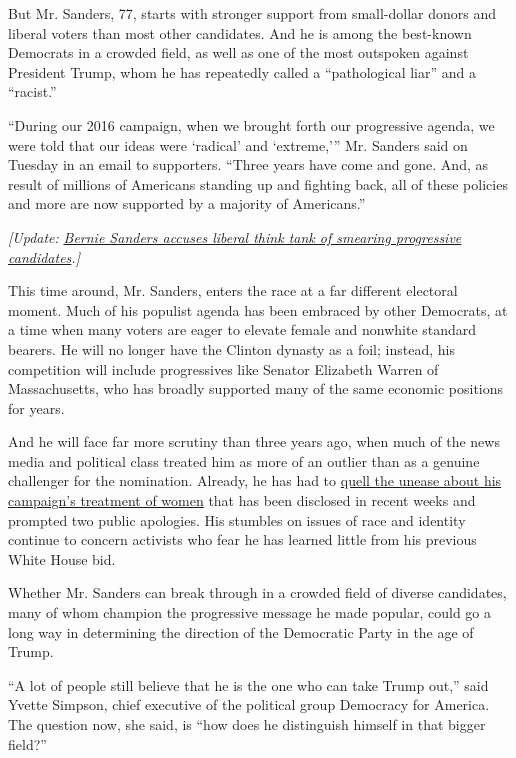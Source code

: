 But Mr. Sanders, 77, starts with stronger support from small-dollar
donors and liberal voters than most other candidates. And he is among
the best-known Democrats in a crowded field, as well as one of the most
outspoken against President Trump, whom he has repeatedly called a
``pathological liar'' and a ``racist.''

``During our 2016 campaign, when we brought forth our progressive
agenda, we were told that our ideas were `radical' and `extreme,''' Mr.
Sanders said on Tuesday in an email to supporters. ``Three years have
come and gone. And, as result of millions of Americans standing up and
fighting back, all of these policies and more are now supported by a
majority of Americans.''

\emph{{[}Update:}
\href{https://www.nytimes.com/2019/04/14/us/politics/bernie-sanders-2020-candidates.html?action=click\&module=Intentional\&pgtype=Article}{\emph{Bernie
Sanders accuses liberal think tank of smearing progressive
candidates}}\emph{.{]}}

This time around, Mr. Sanders, enters the race at a far different
electoral moment. Much of his populist agenda has been embraced by other
Democrats, at a time when many voters are eager to elevate female and
nonwhite standard bearers. He will no longer have the Clinton dynasty as
a foil; instead, his competition will include progressives like Senator
Elizabeth Warren of Massachusetts, who has broadly supported many of the
same economic positions for years.

And he will face far more scrutiny than three years ago, when much of
the news media and political class treated him as more of an outlier
than as a genuine challenger for the nomination. Already, he has had to
\href{https://www.nytimes.com/2019/01/02/us/politics/bernie-sanders-campaign-sexism.html}{quell
the unease about his campaign's treatment of women} that has been
disclosed in recent weeks and prompted two public apologies. His
stumbles on issues of race and identity continue to concern activists
who fear he has learned little from his previous White House bid.

Whether Mr. Sanders can break through in a crowded field of diverse
candidates, many of whom champion the progressive message he made
popular, could go a long way in determining the direction of the
Democratic Party in the age of Trump.

``A lot of people still believe that he is the one who can take Trump
out,'' said Yvette Simpson, chief executive of the political group
Democracy for America. The question now, she said, is ``how does he
distinguish himself in that bigger field?''

